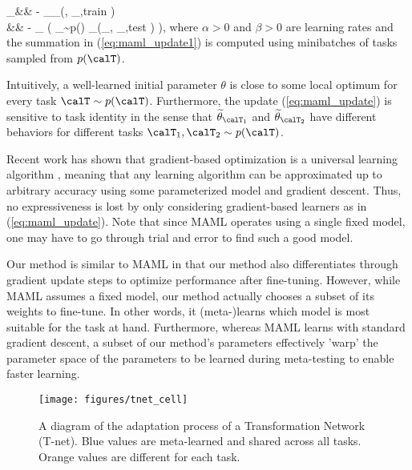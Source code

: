\documentclass{article}
\newcommand{\loss}{\mathcal{L}_{\calT}}
\begin{document}
\be
\label{eq:maml_update}
\widetilde{\theta}_\calT &\leftarrow& \theta - \alpha \nabla_\theta \loss \left(\theta, \calD_{\calT,train} \right) \\
\theta &\leftarrow& \theta - \beta \nabla_{\theta}
\label{eq:maml_update1}
\left( \sum_{\calT \sim p(\calT)} \loss \left(\widetilde{\theta}_{\calT}, \calD_{\calT,test} \right) \right),
\ee
where $\alpha > 0$ and $\beta > 0$ are learning rates and 
the summation in (\ref{eq:maml_update1}) is computed using minibatches of tasks sampled from $p(\calT)$.

Intuitively, a well-learned initial parameter $\theta$ is close to some local optimum for every task $\calT \sim p(\calT)$.
Furthermore, the update (\ref{eq:maml_update}) is sensitive to task identity in the sense that $\widetilde{\theta}_{\calT_1}$ and $\widetilde{\theta}_{\calT_2}$
have different behaviors for different tasks $\calT_1, \calT_2 \sim p(\calT)$.

Recent work has shown that gradient-based optimization is a universal learning algorithm \cite{FinnC2017arxiv}, 
meaning that any learning algorithm can be approximated up to arbitrary accuracy using some parameterized model and gradient descent.
Thus, no expressiveness is lost by only considering gradient-based learners as in (\ref{eq:maml_update}). 
Note that since MAML operates using a single fixed model, one may have to go through trial and error to find such a good model.

Our method is similar to MAML in that our method also differentiates through gradient update steps to optimize performance after fine-tuning.
However, while MAML assumes a fixed model, our method actually chooses a subset of its weights to fine-tune.
In other words, it (meta-)learns which model is most suitable for the task at hand.
Furthermore, whereas MAML learns with standard gradient descent, a subset of our method's parameters effectively 'warp' the parameter space of the parameters to be learned during meta-testing to enable faster learning.







\begin{figure}[ht!]
\centering\texttt{[image: figures/tnet\_cell]}
\caption{A diagram of the adaptation process of a Transformation Network (T-net).
Blue values are meta-learned and shared across all tasks. 
Orange values are different for each task.}
\end{figure}
\end{document}
